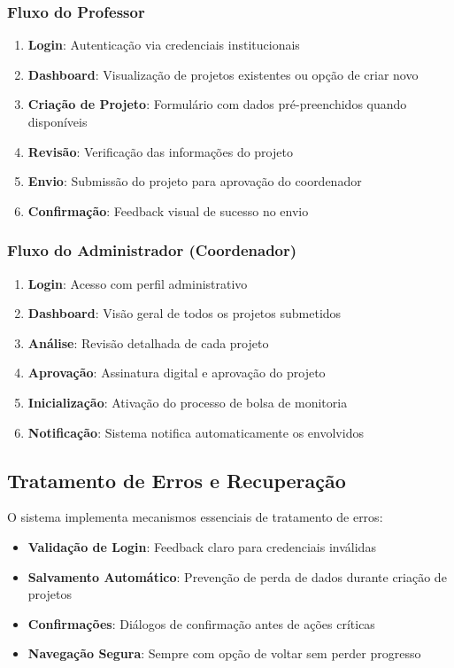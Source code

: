 \documentclass[12pt, a4paper]{report}
\begin{document}
\subsubsection{Fluxo do Professor}
\begin{enumerate}
    \item \textbf{Login}: Autenticação via credenciais institucionais
    \item \textbf{Dashboard}: Visualização de projetos existentes ou opção de criar novo
    \item \textbf{Criação de Projeto}: Formulário com dados pré-preenchidos quando disponíveis
    \item \textbf{Revisão}: Verificação das informações do projeto
    \item \textbf{Envio}: Submissão do projeto para aprovação do coordenador
    \item \textbf{Confirmação}: Feedback visual de sucesso no envio
\end{enumerate}

\subsubsection{Fluxo do Administrador (Coordenador)}
\begin{enumerate}
    \item \textbf{Login}: Acesso com perfil administrativo
    \item \textbf{Dashboard}: Visão geral de todos os projetos submetidos
    \item \textbf{Análise}: Revisão detalhada de cada projeto
    \item \textbf{Aprovação}: Assinatura digital e aprovação do projeto
    \item \textbf{Inicialização}: Ativação do processo de bolsa de monitoria
    \item \textbf{Notificação}: Sistema notifica automaticamente os envolvidos
\end{enumerate}

\subsection{Tratamento de Erros e Recuperação}

O sistema implementa mecanismos essenciais de tratamento de erros:

\begin{itemize}
    \item \textbf{Validação de Login}: Feedback claro para credenciais inválidas
    \item \textbf{Salvamento Automático}: Prevenção de perda de dados durante criação de projetos
    \item \textbf{Confirmações}: Diálogos de confirmação antes de ações críticas
    \item \textbf{Navegação Segura}: Sempre com opção de voltar sem perder progresso
\end{itemize}
\end{document}
